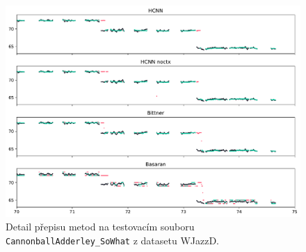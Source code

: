 


\begin{figure}[h]\centering
\includegraphics[width=\textwidth,height=\textheight,keepaspectratio]{../img/vysledky/wjazzd_CannonballAdderley_SoWh}
\caption{Detail přepisu metod na testovacím souboru \texttt{Cannonball\allowbreak{}Adderley\allowbreak{}\_\allowbreak{}So\allowbreak{}What} z datasetu WJazzD.}
\label{obr:wjazzd_CannonballAdderley_SoWhat_detail}
\end{figure}


